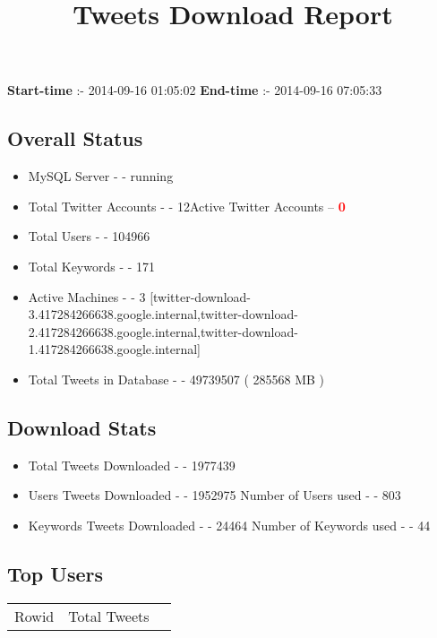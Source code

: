 \documentclass{article}\usepackage[T1]{fontenc}
\begin{document}
\title{\textbf{Tweets Download Report}}
               \date{}
                \maketitle
               \centerline{\textbf{Start-time} :- 2014-09-16 01:05:02 \hspace{40pt} \textbf{End-time} :- 2014-09-16 07:05:33}               \subsection*{Overall Status}                \begin{itemize}                \item MySQL Server - - running               \item Total Twitter Accounts - - 12\newline Active Twitter Accounts -- \textcolor{red}{\textbf{0}}               \item Total Users - - 104966               \item Total Keywords - - 171               \item Active Machines - - 3 [twitter-download-3.417284266638.google.internal,twitter-download-2.417284266638.google.internal,twitter-download-1.417284266638.google.internal]               \item Total Tweets in Database - - 49739507 ( 285568 MB )               \end{itemize}               \subsection*{Download Stats}                \begin{itemize}                \item Total Tweets Downloaded - - 1977439               \item Users Tweets Downloaded - - 1952975 \newline Number of Users used - - 803               \item Keywords Tweets Downloaded - - 24464 \newline Number of Keywords used - - 44              \end{itemize}              \subsection*{Top Users}\begin{tabular}{|c|c|c|}         \hline         Rowid & Total Tweets \\ 

\end{tabular}
\end{document}
